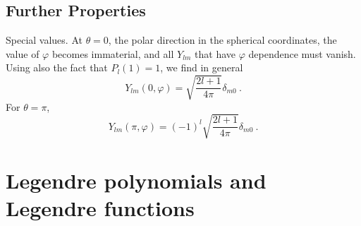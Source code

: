 \documentclass[12pt,a4paper]{article}
\begin{document}
\subsection{Further Properties}
Special values. At $\theta = 0$, the polar direction in the spherical coordinates, the value of $\varphi$ becomes immaterial, and all $Y_{lm}$ that have $\varphi$ dependence must vanish. Using also the fact that $P_l(1) = 1$, we find in general
\begin{equation}
Y_{lm}(0,\varphi) = \sqrt{\dfrac{2l+1}{4\pi}} \delta_{m0} ~.
\end{equation}
For $\theta = \pi$,
\begin{equation}
Y_{lm}(\pi,\varphi) = (-1)^l \sqrt{\dfrac{2l+1}{4\pi}} \delta_{m0} ~.
\end{equation}


























\section{Legendre polynomials and Legendre functions}
\cite{2008cmb..book.....D}










































\end{document}
